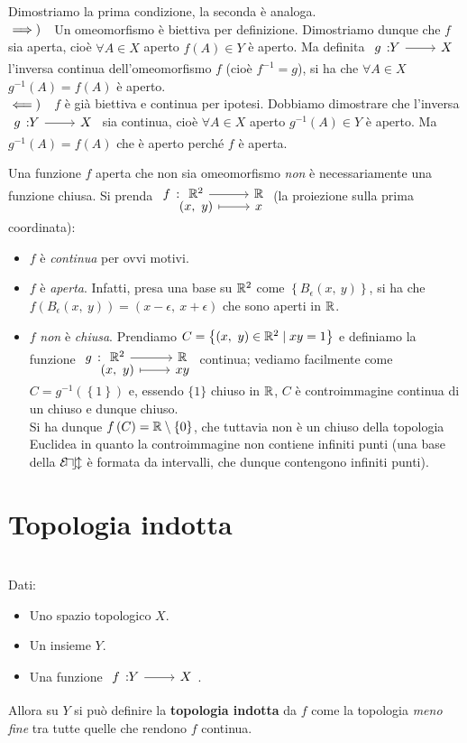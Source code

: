 \begin{demonstration}
Dimostriamo la prima condizione, la seconda è analoga.\\
$\implies)\quad$Un omeomorfismo è biettiva per definizione. Dimostriamo dunque che $f$ sia aperta, cioè $\forall A\in X$ aperto $f\left(A\right)\in Y$ è aperto. Ma definita $\funz{g}{Y}{X}$ l'inversa continua dell'omeomorfismo $f$ (cioè $f^{-1}=g$), si ha che $\forall A\in X$ $g^{-1}\left(A\right)=f\left(A\right)$ è aperto.\\
$\impliedby)\quad$$f$ è già biettiva e continua per ipotesi. Dobbiamo dimostrare che l'inversa $\funz{g}{Y}{X}$ sia continua, cioè $\forall A\in X$ aperto $g^{-1}\left(A\right)\in Y$ è aperto. Ma $g^{-1}\left(A\right)=f\left(A\right)$ che è aperto perché $f$ è aperta.
\end{demonstration}
\begin{attention}
	Una funzione $f$ aperta che non sia omeomorfismo \textit{non} è necessariamente una funzione chiusa. Si prenda $\funztot{f}{\realset^2}{\realset}{\left(x,\ y\right)}{x}$ (la proiezione sulla prima coordinata):
	\begin{itemize}
		\item $f$ è \textit{continua} per ovvi motivi.
		\item $f$ è \textit{aperta}. Infatti, presa una base su $\mathbb{R}^2$ come $\left\{B_{\epsilon}\left(x,\ y\right)\right\}$, si ha che $f\left(B_{\epsilon}\left(x,\ y\right)\right)=\left(x-\epsilon,\ x+\epsilon\right)$ che sono aperti in $\mathbb{R}$.
		\item $f$ \textit{non} è \textit{chiusa}. Prendiamo $C=\left\{\left(x,\ y\right)\in \mathbb{R}^2\mid xy=1 \right\}$ e definiamo la funzione $\funztot{g}{\realset^2}{\realset}{\left(x,\ y\right)}{xy}$ continua; vediamo facilmente come $C=g^{-1}\left(\left\{1\right\}\right)$ e, essendo $\{1\}$ chiuso in $\mathbb{R}$, $C$ è controimmagine continua di un chiuso e dunque chiuso.\\
		Si ha dunque $f\left(C\right)=\mathbb{R}\setminus\left\{0\right\}$, che tuttavia non è un chiuso della topologia Euclidea in quanto la controimmagine non contiene infiniti punti (una base della $\mathcal{E\! u\! c\! l}$ è formata da intervalli, che dunque contengono infiniti punti).
	\end{itemize}
	\vspace{-3mm}
\end{attention}
\section{Topologia indotta}
\begin{define}~{}\\
Dati:
\begin{itemize}
\item Uno spazio topologico $X$.
\item Un insieme $Y$.
\item Una funzione $\funz{f}{Y}{X}$.
\end{itemize}
Allora su $Y$ si può definire la \textbf{topologia indotta} da $f$ come la topologia \textit{meno fine} tra tutte quelle che rendono $f$ continua.
\end{define}

